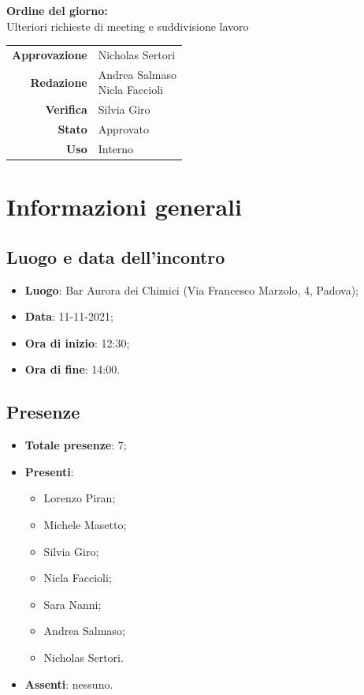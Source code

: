 \documentclass[11pt]{article}
\begin{document}
\begin{titlepage}
\begin{center}
			\large
			
			\vfill
			\large \textbf{Ordine del giorno:} \\
			Ulteriori richieste di meeting e suddivisione lavoro\\
			\vfill
			
			\begin{tabular}{r|l}
				\textbf{Approvazione} &  Nicholas Sertori\\
				\textbf{Redazione} &  \parbox[t]{3.5cm}{Andrea Salmaso \\Nicla Faccioli}\\
				\textbf{Verifica} &  Silvia Giro\\
				\textbf{Stato} & Approvato \\
				\textbf{Uso} & Interno
			\end{tabular}
			\vfill
			
		\end{center}
	\end{titlepage}

	\newpage
	
	\section{Informazioni generali}
	\subsection{Luogo e data dell'incontro}
	\begin{itemize}
		\item \textbf{Luogo}: Bar Aurora dei Chimici (Via Francesco Marzolo, 4, Padova);
		\item \textbf{Data}: 11-11-2021;
		\item \textbf{Ora di inizio}: 12:30;
		\item \textbf{Ora di fine}: 14:00.
	\end{itemize}
	
	\subsection{Presenze}
	\begin{itemize}
		\item \textbf{Totale presenze}: 7;
		\item \textbf{Presenti}:
		\begin{itemize}
			\item Lorenzo Piran; 
			\item Michele Masetto;
			\item Silvia Giro;
			\item Nicla Faccioli;
			\item Sara Nanni;
			\item Andrea Salmaso;
			\item Nicholas Sertori.
		\end{itemize}
		\item \textbf{Assenti}: nessuno.
	\end{itemize}
\end{document}

